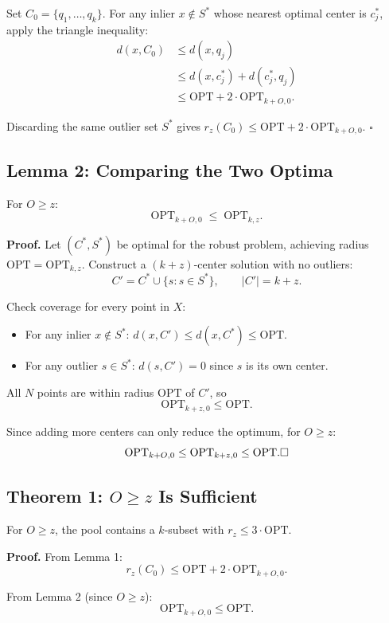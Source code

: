\documentclass[11pt]{article}
\begin{document}
Set $C_0 = \{q_1, \dots, q_k\}$. For any inlier $x \notin S^*$ whose nearest optimal center is $c^*_j$, apply the triangle inequality:
\begin{align*}
d(x, C_0) &\le d(x, q_j) \\
           &\le d(x, c^*_j) + d(c^*_j, q_j) \\
           &\le \mathrm{OPT} + 2 \cdot \mathrm{OPT}_{k+O,0}.
\end{align*}

Discarding the same outlier set $S^*$ gives $r_z(C_0) \le \mathrm{OPT} + 2 \cdot \mathrm{OPT}_{k+O,0}$. \hfill$\square$

\subsection{Lemma 2: Comparing the Two Optima}

For $O \ge z$:
\[
\mathrm{OPT}_{k+O,0} \;\le\; \mathrm{OPT}_{k,z}.
\]

\textbf{Proof.} Let $(C^*, S^*)$ be optimal for the robust problem, achieving radius $\mathrm{OPT} = \mathrm{OPT}_{k,z}$. Construct a $(k{+}z)$-center solution with no outliers:
\[
C' = C^* \cup \{s : s \in S^*\}, \qquad |C'| = k + z.
\]

Check coverage for every point in $X$:
\begin{itemize}
    \item For any inlier $x \notin S^*$: $d(x, C') \le d(x, C^*) \le \mathrm{OPT}$.
    \item For any outlier $s \in S^*$: $d(s, C') = 0$ since $s$ is its own center.
\end{itemize}

All $N$ points are within radius $\mathrm{OPT}$ of $C'$, so
\[
\mathrm{OPT}_{k+z,0} \le \mathrm{OPT}.
\]

Since adding more centers can only reduce the optimum, for $O \ge z$:
\[
\mathrm{OPT}_{k+O,0} \le \mathrm{OPT}_{k+z,0} \le \mathrm{OPT}. \hfill\square
\]

\subsection{Theorem 1: $O \ge z$ Is Sufficient}

For $O \ge z$, the pool contains a $k$-subset with $r_z \le 3 \cdot \mathrm{OPT}$.

\textbf{Proof.} From Lemma 1:
\[
r_z(C_0) \le \mathrm{OPT} + 2 \cdot \mathrm{OPT}_{k+O,0}.
\]

From Lemma 2 (since $O \ge z$):
\[
\mathrm{OPT}_{k+O,0} \le \mathrm{OPT}.
\]
\end{document}
